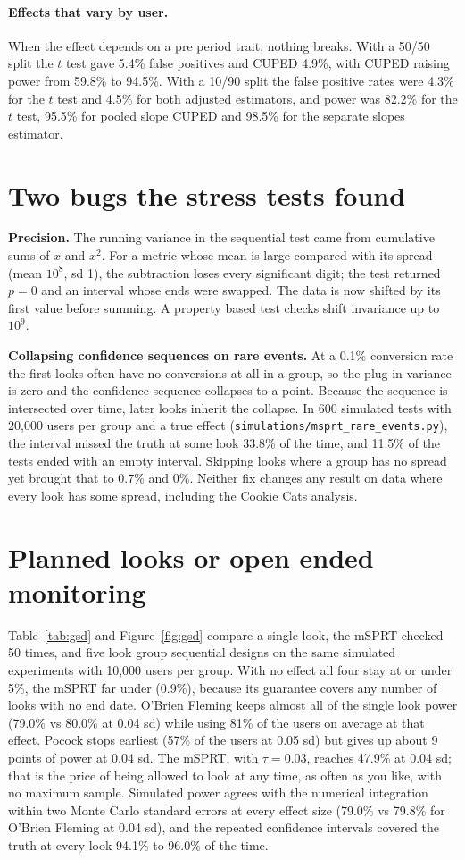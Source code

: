 \documentclass[10pt]{article}
\begin{document}
\paragraph{Effects that vary by user.} When the effect depends on a pre period trait, nothing breaks. With a 50/50 split the $t$ test gave 5.4\% false positives and CUPED 4.9\%, with CUPED raising power from 59.8\% to 94.5\%. With a 10/90 split the false positive rates were 4.3\% for the $t$ test and 4.5\% for both adjusted estimators, and power was 82.2\% for the $t$ test, 95.5\% for pooled slope CUPED and 98.5\% for the separate slopes estimator.

\section{Two bugs the stress tests found}\label{sec:bugs}
\textbf{Precision.} The running variance in the sequential test came from cumulative sums of $x$ and $x^2$. For a metric whose mean is large compared with its spread (mean $10^8$, sd 1), the subtraction loses every significant digit; the test returned $p = 0$ and an interval whose ends were swapped. The data is now shifted by its first value before summing. A property based test checks shift invariance up to $10^9$.

\textbf{Collapsing confidence sequences on rare events.} At a 0.1\% conversion rate the first looks often have no conversions at all in a group, so the plug in variance is zero and the confidence sequence collapses to a point. Because the sequence is intersected over time, later looks inherit the collapse. In 600 simulated tests with 20,000 users per group and a true effect (\texttt{simulations/msprt\_rare\_events.py}), the interval missed the truth at some look 33.8\% of the time, and 11.5\% of the tests ended with an empty interval. Skipping looks where a group has no spread yet brought that to 0.7\% and 0\%. Neither fix changes any result on data where every look has some spread, including the Cookie Cats analysis.

\section{Planned looks or open ended monitoring}
Table~\ref{tab:gsd} and Figure~\ref{fig:gsd} compare a single look, the mSPRT checked 50 times, and five look group sequential designs on the same simulated experiments with 10,000 users per group. With no effect all four stay at or under 5\%, the mSPRT far under (0.9\%), because its guarantee covers any number of looks with no end date. O'Brien Fleming keeps almost all of the single look power (79.0\% vs 80.0\% at 0.04 sd) while using 81\% of the users on average at that effect. Pocock stops earliest (57\% of the users at 0.05 sd) but gives up about 9 points of power at 0.04 sd. The mSPRT, with $\tau = 0.03$, reaches 47.9\% at 0.04 sd; that is the price of being allowed to look at any time, as often as you like, with no maximum sample. Simulated power agrees with the numerical integration within two Monte Carlo standard errors at every effect size (79.0\% vs 79.8\% for O'Brien Fleming at 0.04 sd), and the repeated confidence intervals covered the truth at every look 94.1\% to 96.0\% of the time.
\end{document}
